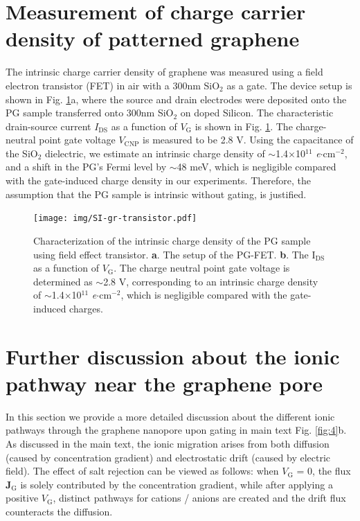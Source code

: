 \documentclass[journal=langd5,email=true, hyperref=true, keywords=false]{achemso}
\begin{document}
\section{Measurement of charge carrier density of patterned graphene}
\label{sec:charge-dens}
The intrinsic charge carrier density of graphene was measured using a
field electron transistor (FET) in air with a 300nm SiO$_2$ as a
gate. The device setup is shown in Fig. \ref{fig:charge-dens}a,
where the source and drain electrodes were deposited onto the PG
sample transferred onto 300nm SiO$_2$ on doped Silicon. The
characteristic drain-source current $I_{\mathrm{DS}}$ as a function of
$V_{\mathrm{G}}$ is shown in Fig. \ref{fig:charge-dens}. The
charge-neutral point gate voltage $V_{\mathrm{CNP}}$ is measured to be 2.8 V.
Using the capacitance of the SiO$_{2}$ dielectric, we estimate an intrinsic
charge density of $\sim{}$1.4$\times$10$^{11}$
\textit{e}$\cdot$cm$^{-2}$, and a shift in the PG's Fermi level by
$\sim{}$48 meV, which is negligible compared with the gate-induced
charge density in our experiments. Therefore, the assumption that the
PG sample is intrinsic without gating, is justified.

\begin{figure}[htbp]
  \centering
  \texttt{[image: img/SI-gr-transistor.pdf]}
  \caption{Characterization of the intrinsic charge density of the PG
    sample using field effect transistor. \textbf{a}. The setup of the
    PG-FET. \textbf{b}. The I$_{\mathrm{DS}}$ as a function of
    $V_{\mathrm{G}}$. The charge neutral point gate voltage is
    determined as $\sim{}$2.8 V, corresponding to an intrinsic charge
    density of $\sim{}$1.4$\times$10$^{11}$
    \textit{e}$\cdot$cm$^{-2}$, which is negligible compared with the
    gate-induced charges.}
  \label{fig:charge-dens}
\end{figure}

\pagebreak

\section{Further discussion about the ionic pathway near the graphene pore}
\label{sec:conc}

In this section we provide a more detailed discussion about the
different ionic pathways through the graphene nanopore upon gating in
main text Fig. \ref{fig:4}b. As discussed in the main text, the
ionic migration arises from both diffusion (caused by
concentration gradient) and electrostatic drift (caused by electric
field).  The effect of salt rejection can be viewed as follows: when
$V_{\mathrm{G}}$ = 0, the flux $\boldsymbol{J}_{\mathrm{G}}$ is solely
contributed by the concentration gradient, while after applying a
positive $V_{\mathrm{G}}$, distinct pathways for cations /
anions are created and the drift flux counteracts the diffusion.
\end{document}
